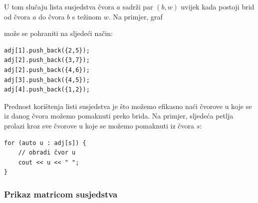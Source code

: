 U tom slučaju lista susjedstva čvora $a$
sadrži par $(b,w)$
uvijek kada postoji brid od čvora $a$ do čvora $b$
s težinom $w$. Na primjer, graf

\begin{center}
\end{center}
može se pohraniti na sljedeći način:
\begin{lstlisting}
adj[1].push_back({2,5});
adj[2].push_back({3,7});
adj[2].push_back({4,6});
adj[3].push_back({4,5});
adj[4].push_back({1,2});
\end{lstlisting}

Prednost korištenja listi susjedstva je što
možemo efikasno naći čvorove u koje
se iz danog čvora možemo pomaknuti preko brida.
Na primjer, sljedeća petlja prolazi kroz sve čvorove
u koje se možemo pomaknuti iz čvora $s$:

\begin{lstlisting}
for (auto u : adj[s]) {
    // obradi čvor u
    cout << u << " ";
}
\end{lstlisting}

\subsubsection{Prikaz matricom susjedstva}


